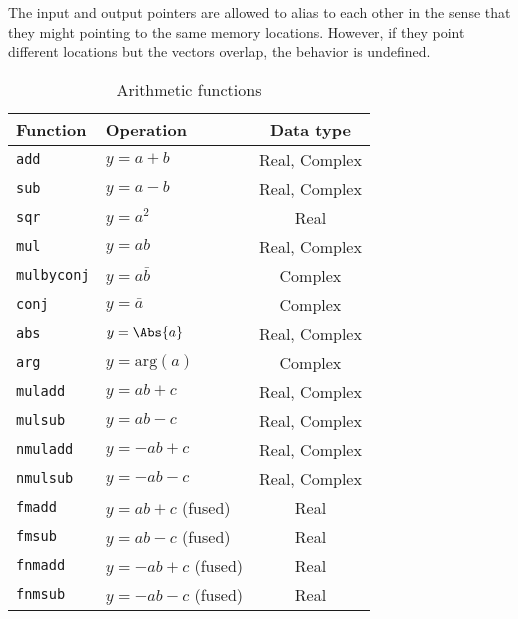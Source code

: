The input and output pointers are allowed to alias to each other in the sense
that they might pointing to the same memory locations. However, if they point
different locations but the vectors overlap, the behavior is undefined.

\begin{table}
  \begin{tabularx}{\textwidth}{LLC}
    \toprule
    Function & Operation & Data type \\
    \midrule
    \texttt{add}       & $y = a + b$           & Real, Complex \\
    \texttt{sub}       & $y = a - b$           & Real, Complex \\
    \texttt{sqr}       & $y = a^2$             & Real          \\
    \texttt{mul}       & $y = ab$              & Real, Complex \\
    \texttt{mulbyconj} & $y = a\bar{b}$        & Complex       \\
    \texttt{conj}      & $y = \bar{a}$         & Complex       \\
    \texttt{abs}       & $y = \Abs{a}$         & Real, Complex \\
    \texttt{arg}       & $y = \mathrm{arg}(a)$ & Complex       \\
    \texttt{muladd}    & $y = ab + c$          & Real, Complex \\
    \texttt{mulsub}    & $y = ab - c$          & Real, Complex \\
    \texttt{nmuladd}   & $y = -ab + c$         & Real, Complex \\
    \texttt{nmulsub}   & $y = -ab - c$         & Real, Complex \\
    \texttt{fmadd}     & $y = ab + c$ (fused)  & Real          \\
    \texttt{fmsub}     & $y = ab - c$ (fused)  & Real          \\
    \texttt{fnmadd}    & $y = -ab + c$ (fused) & Real          \\
    \texttt{fnmsub}    & $y = -ab - c$ (fused) & Real          \\
    \bottomrule
  \end{tabularx}
  \caption{Arithmetic functions}
  \label{tab:Arithmetic functions}
\end{table}

